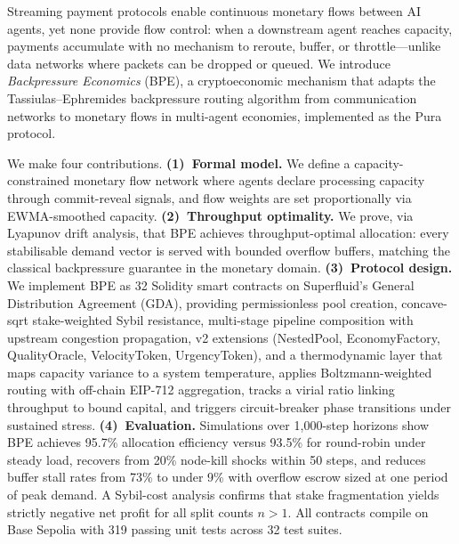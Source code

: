 Streaming payment protocols enable continuous monetary flows between AI agents,
yet none provide flow control: when a downstream agent reaches capacity, payments
accumulate with no mechanism to reroute, buffer, or throttle---unlike data networks
where packets can be dropped or queued. We introduce \emph{Backpressure Economics}
(BPE), a cryptoeconomic mechanism that adapts the Tassiulas--Ephremides backpressure
routing algorithm from communication networks to monetary flows in multi-agent
economies, implemented as the Pura protocol.

We make four contributions. \textbf{(1)~Formal model.} We define a capacity-constrained
monetary flow network where agents declare processing capacity through
commit-reveal signals, and flow weights are set proportionally via EWMA-smoothed
capacity. \textbf{(2)~Throughput optimality.} We prove, via Lyapunov drift analysis,
that BPE achieves throughput-optimal allocation: every stabilisable demand vector
is served with bounded overflow buffers, matching the classical backpressure guarantee
in the monetary domain. \textbf{(3)~Protocol design.} We implement BPE as 32
Solidity smart contracts on Superfluid's General Distribution Agreement (GDA),
providing permissionless pool creation, concave-sqrt stake-weighted Sybil resistance,
multi-stage pipeline composition with upstream congestion propagation,
v2 extensions (NestedPool, EconomyFactory, QualityOracle, VelocityToken, UrgencyToken),
and a thermodynamic layer that maps capacity variance to a system temperature,
applies Boltzmann-weighted routing with off-chain EIP-712 aggregation,
tracks a virial ratio linking throughput to bound capital,
and triggers circuit-breaker phase transitions under sustained stress.
\textbf{(4)~Evaluation.} Simulations over 1{,}000-step horizons show BPE achieves
95.7\% allocation efficiency versus 93.5\% for round-robin under steady load,
recovers from 20\% node-kill shocks within 50 steps, and reduces buffer stall rates
from 73\% to under 9\% with overflow escrow sized at one period of peak demand.
A Sybil-cost analysis confirms that stake fragmentation yields strictly negative
net profit for all split counts $n > 1$. All contracts compile on Base Sepolia
with 319 passing unit tests across 32 test suites.
